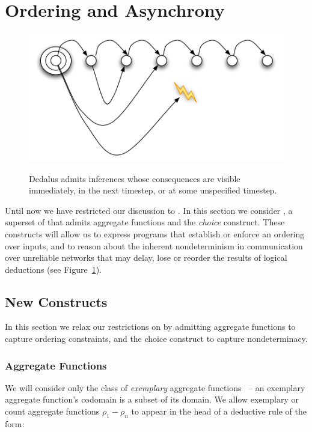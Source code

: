 \section{Ordering and Asynchrony}
\label{sec:async}

\begin{figure}[t]
  \centering
  \includegraphics[width=0.75\linewidth]{figures/dedalus-time.pdf}
  \label{fig:time}
   \caption{Dedalus admits inferences whose consequences are visible immediately, in the next timestep, or at some unspecified timestep.}
   
\vspace{-8pt}
\end{figure}

Until now we have restricted our discussion to \slang.  In this section we
consider \lang, a superset of \slang that admits aggregate functions
and the \emph{choice} construct.  These constructs will allow us to
express programs that establish or enforce an ordering over inputs, and to
reason about the inherent nondeterminism in communication over unreliable
networks that may delay, lose or reorder the results of logical deductions 
(see Figure~\ref{fig:time}).

\subsection{New Constructs}

In this section we relax our restrictions on \slang by admitting aggregate functions to 
capture ordering constraints, and the choice construct to capture nondeterminacy.

\subsubsection{Aggregate Functions}

We will consider only the class of \emph{exemplary} aggregate
functions~\cite{tag} -- an exemplary aggregate function's codomain is a subset
of its domain. 
We allow exemplary or count aggregate functions $\rho_1 - \rho_n$ to appear
in the head of a deductive rule of the form:

